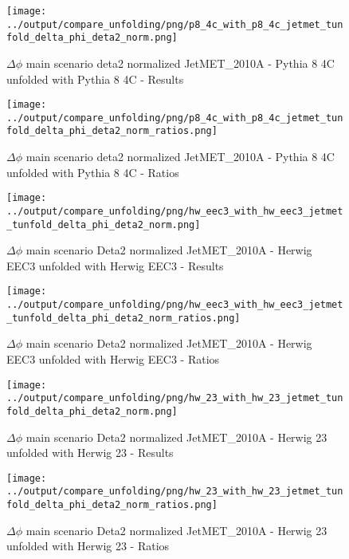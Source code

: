\documentclass[11pt]{book}
\begin{document}
\begin{figure}[ht]
\centering
\texttt{[image: ../output/compare\_unfolding/png/p8\_4c\_with\_p8\_4c\_jetmet\_tunfold\_delta\_phi\_deta2\_norm.png]}
\caption{$\Delta\phi$ main scenario deta2 normalized JetMET\_2010A - Pythia 8 4C unfolded with Pythia 8 4C - Results}
\label{p8_p8_jetmet_tunfold_delta_phi_deta2_norm_a}
\end{figure}

\begin{figure}[ht]
\centering
\texttt{[image: ../output/compare\_unfolding/png/p8\_4c\_with\_p8\_4c\_jetmet\_tunfold\_delta\_phi\_deta2\_norm\_ratios.png]}
\caption{$\Delta\phi$ main scenario deta2 normalized JetMET\_2010A - Pythia 8 4C unfolded with Pythia 8 4C - Ratios}
\label{p8_p8_jetmet_tunfold_delta_phi_deta2_norm_b}
\end{figure}

\begin{figure}[ht]
\centering
\texttt{[image: ../output/compare\_unfolding/png/hw\_eec3\_with\_hw\_eec3\_jetmet\_tunfold\_delta\_phi\_deta2\_norm.png]}
\caption{$\Delta\phi$ main scenario Deta2 normalized JetMET\_2010A - Herwig EEC3 unfolded with Herwig EEC3 - Results}
\label{hw_eec3_hw_eec3_jetmet_tunfold_delta_phi_deta2_norm_a}
\end{figure}

\begin{figure}[ht]
\centering
\texttt{[image: ../output/compare\_unfolding/png/hw\_eec3\_with\_hw\_eec3\_jetmet\_tunfold\_delta\_phi\_deta2\_norm\_ratios.png]}
\caption{$\Delta\phi$ main scenario Deta2 normalized JetMET\_2010A - Herwig EEC3 unfolded with Herwig EEC3 - Ratios}
\label{hw_eec3_hw_eec3_jetmet_tunfold_delta_phi_deta2_norm_b}
\end{figure}

\begin{figure}[ht]
\centering
\texttt{[image: ../output/compare\_unfolding/png/hw\_23\_with\_hw\_23\_jetmet\_tunfold\_delta\_phi\_deta2\_norm.png]}
\caption{$\Delta\phi$ main scenario Deta2 normalized JetMET\_2010A - Herwig 23 unfolded with Herwig 23 - Results}
\label{hw_23_hw_23_jetmet_tunfold_delta_phi_deta2_norm_a}
\end{figure}

\begin{figure}[ht]
\centering
\texttt{[image: ../output/compare\_unfolding/png/hw\_23\_with\_hw\_23\_jetmet\_tunfold\_delta\_phi\_deta2\_norm\_ratios.png]}
\caption{$\Delta\phi$ main scenario Deta2 normalized JetMET\_2010A - Herwig 23 unfolded with Herwig 23 - Ratios}
\label{hw_23_hw_23_jetmet_tunfold_delta_phi_deta2_norm_b}
\end{figure}
\end{document}
